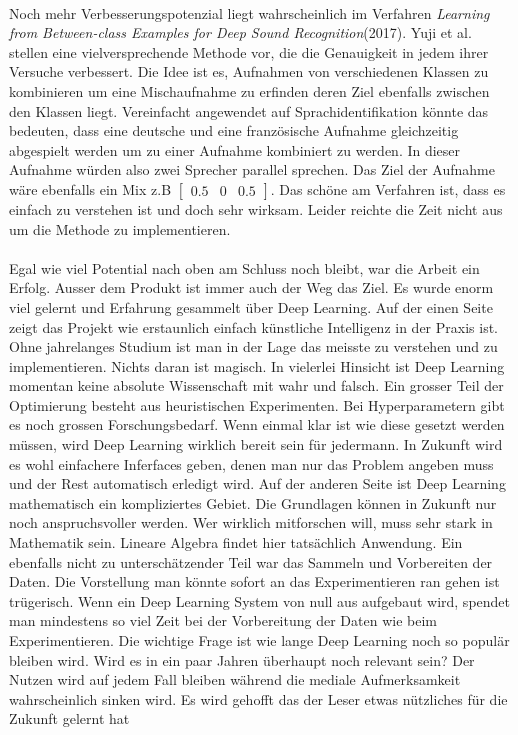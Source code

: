 \\
Noch mehr Verbesserungspotenzial liegt wahrscheinlich im Verfahren \textit{Learning from Between-class Examples for Deep Sound Recognition}(2017)\parencite{between}. Yuji et al. stellen eine vielversprechende Methode vor, die die Genauigkeit in jedem ihrer Versuche verbessert. Die Idee ist es, Aufnahmen von verschiedenen Klassen zu kombinieren um eine Mischaufnahme zu erfinden deren Ziel ebenfalls zwischen den Klassen liegt. Vereinfacht angewendet auf Sprachidentifikation könnte das bedeuten, dass eine deutsche und eine französische Aufnahme gleichzeitig abgespielt werden um zu einer Aufnahme kombiniert zu werden. In dieser Aufnahme würden also zwei Sprecher parallel sprechen. Das Ziel der Aufnahme wäre ebenfalls ein Mix z.B $\begin{bmatrix}0.5 & 0 & 0.5 \end{bmatrix}$. Das schöne am Verfahren ist, dass es einfach zu verstehen ist und doch sehr wirksam. Leider reichte die Zeit nicht aus um die Methode zu implementieren.
\\ \\ 
Egal wie viel Potential nach oben am Schluss noch bleibt, war die Arbeit ein Erfolg. Ausser dem Produkt ist immer auch der Weg das Ziel. Es wurde enorm viel gelernt und Erfahrung gesammelt über Deep Learning. Auf der einen Seite zeigt das Projekt wie erstaunlich einfach künstliche Intelligenz in der Praxis ist. Ohne jahrelanges Studium ist man in der Lage das meisste zu verstehen und zu implementieren. Nichts daran ist magisch. In vielerlei Hinsicht ist Deep Learning momentan keine absolute Wissenschaft mit wahr und falsch. Ein grosser Teil der Optimierung besteht aus heuristischen Experimenten. Bei Hyperparametern gibt es noch grossen Forschungsbedarf. Wenn einmal klar ist wie diese gesetzt werden müssen, wird Deep Learning wirklich bereit sein für jedermann. In Zukunft wird es wohl einfachere Inferfaces geben, denen man nur das Problem angeben muss und der Rest automatisch erledigt wird. Auf der anderen Seite ist Deep Learning mathematisch ein kompliziertes Gebiet. Die Grundlagen können in Zukunft nur noch anspruchsvoller werden. Wer wirklich mitforschen will, muss sehr stark in Mathematik sein. Lineare Algebra findet hier tatsächlich Anwendung. Ein ebenfalls nicht zu unterschätzender Teil war das Sammeln und Vorbereiten der Daten. Die Vorstellung man könnte sofort an das Experimentieren ran gehen ist trügerisch. Wenn ein Deep Learning System von null aus aufgebaut wird, spendet man mindestens so viel Zeit bei der Vorbereitung der Daten wie beim Experimentieren. Die wichtige Frage ist wie lange Deep Learning noch so populär bleiben wird. Wird es in ein paar Jahren überhaupt noch relevant sein? Der Nutzen wird auf jedem Fall bleiben während die mediale Aufmerksamkeit wahrscheinlich sinken wird. Es wird gehofft das der Leser etwas nützliches für die Zukunft gelernt hat
